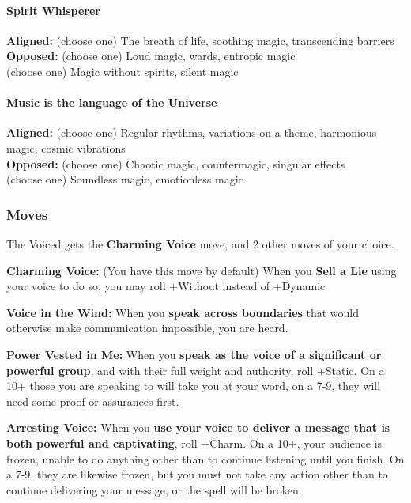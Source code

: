 \documentclass[
]{article}
\begin{document}
\hypertarget{spirit-whisperer}{%
\paragraph{Spirit Whisperer}\label{spirit-whisperer}}

\textbf{Aligned:} (choose one) The breath of life, soothing magic,
transcending barriers\\
\textbf{Opposed:} (choose one) Loud magic, wards, entropic magic\\
(choose one) Magic without spirits, silent magic

\hypertarget{music-is-the-language-of-the-universe}{%
\paragraph{Music is the language of the
Universe}\label{music-is-the-language-of-the-universe}}

\textbf{Aligned:} (choose one) Regular rhythms, variations on a theme,
harmonious magic, cosmic vibrations\\
\textbf{Opposed:} (choose one) Chaotic magic, countermagic, singular
effects\\
(choose one) Soundless magic, emotionless magic

\hypertarget{moves-7}{%
\subsubsection{Moves}\label{moves-7}}

The Voiced gets the \textbf{Charming Voice} move, and 2 other moves of
your choice.

\textbf{Charming Voice:} (You have this move by default) When you
\textbf{Sell a Lie} using your voice to do so, you may roll +Without
instead of +Dynamic

\textbf{Voice in the Wind:} When you \textbf{speak across boundaries}
that would otherwise make communication impossible, you are heard.

\textbf{Power Vested in Me:} When you \textbf{speak as the voice of a
significant or powerful group}, and with their full weight and
authority, roll +Static. On a 10+ those you are speaking to will take
you at your word, on a 7-9, they will need some proof or assurances
first.

\textbf{Arresting Voice:} When you \textbf{use your voice to deliver a
message that is both powerful and captivating}, roll +Charm. On a 10+,
your audience is frozen, unable to do anything other than to continue
listening until you finish. On a 7-9, they are likewise frozen, but you
must not take any action other than to continue delivering your message,
or the spell will be broken.
\end{document}
